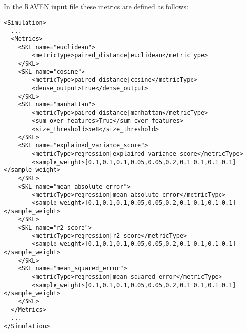 In the RAVEN input file these metrics are defined as follows:
\begin{lstlisting}[style=XML]
<Simulation>
  ...
  <Metrics>
    <SKL name="euclidean">
        <metricType>paired_distance|euclidean</metricType>
    </SKL>
    <SKL name="cosine">
        <metricType>paired_distance|cosine</metricType>
        <dense_output>True</dense_output>
    </SKL>
    <SKL name="manhattan">
        <metricType>paired_distance|manhattan</metricType>
        <sum_over_features>True</sum_over_features>
        <size_threshold>5e8</size_threshold>
    </SKL>
    <SKL name="explained_variance_score">
        <metricType>regression|explained_variance_score</metricType>
        <sample_weight>[0.1,0.1,0.1,0.05,0.05,0.2,0.1,0.1,0.1,0.1]</sample_weight>
    </SKL>
    <SKL name="mean_absolute_error">
        <metricType>regression|mean_absolute_error</metricType>
        <sample_weight>[0.1,0.1,0.1,0.05,0.05,0.2,0.1,0.1,0.1,0.1]</sample_weight>
    </SKL>
    <SKL name="r2_score">
        <metricType>regression|r2_score</metricType>
        <sample_weight>[0.1,0.1,0.1,0.05,0.05,0.2,0.1,0.1,0.1,0.1]</sample_weight>
    </SKL>
    <SKL name="mean_squared_error">
        <metricType>regression|mean_squared_error</metricType>
        <sample_weight>[0.1,0.1,0.1,0.05,0.05,0.2,0.1,0.1,0.1,0.1]</sample_weight>
    </SKL>
  </Metrics>
  ...
</Simulation>
\end{lstlisting}

